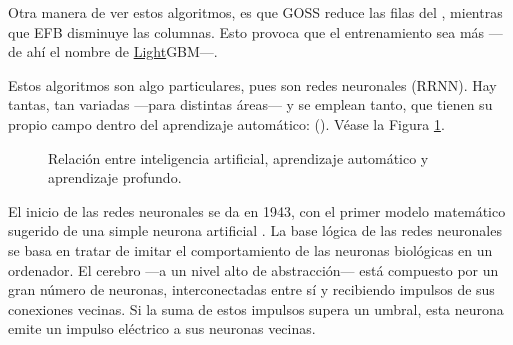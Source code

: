 {
\addtocounter{footnote}{1}

Otra manera de ver estos algoritmos, es que GOSS reduce las filas del , mientras que EFB disminuye las columnas. Esto provoca que el entrenamiento sea más  ---de ahí el nombre de \ul{Light}GBM---.

\bigskip

\label{rrnn}

Estos algoritmos son algo particulares, pues son redes neuronales (RRNN). Hay tantas, tan variadas ---para distintas áreas--- y se emplean tanto, que tienen su propio campo dentro del aprendizaje automático:  (). Véase la Figura \ref{IA}.
\begin{figure}[H]
    \centering
    \caption{Relación entre inteligencia artificial, aprendizaje automático y aprendizaje profundo.}
    \label{IA}
\end{figure}

El inicio de las redes neuronales se da en 1943, con el primer modelo matemático sugerido de una simple neurona artificial \parencite{artneu}. La base lógica de las redes neuronales se basa en tratar de imitar el comportamiento de las neuronas biológicas en un ordenador. El cerebro ---a un nivel alto de abstracción--- está compuesto por un gran número de neuronas, interconectadas entre sí y recibiendo impulsos de sus conexiones vecinas. Si la suma de estos impulsos supera un umbral, esta neurona emite un impulso eléctrico a sus neuronas vecinas.

}
